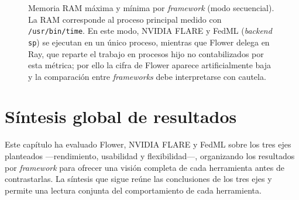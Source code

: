\begin{figure}[htbp]
  \centering
  \begin{minipage}{0.48\textwidth}
    \centering
  \end{minipage}\hfill
  \begin{minipage}{0.48\textwidth}
    \centering
  \end{minipage}
  \caption{Memoria RAM máxima y mínima por \textit{framework} (modo secuencial). La RAM corresponde al proceso principal medido con \texttt{/usr/bin/time}. En este modo, NVIDIA FLARE y FedML (\textit{backend} \texttt{sp}) se ejecutan en un único proceso, mientras que Flower delega en Ray, que reparte el trabajo en procesos hijo no contabilizados por esta métrica; por ello la cifra de Flower aparece artificialmente baja y la comparación entre \textit{frameworks} debe interpretarse con cautela.}
  \label{fig:maxmin-ram}
\end{figure}


\section{Síntesis global de resultados}\label{sec:sintesis-resultados}

Este capítulo ha evaluado Flower, NVIDIA FLARE y FedML sobre los tres ejes
planteados —rendimiento, usabilidad y flexibilidad—, organizando los resultados por
\textit{framework} para ofrecer una visión completa de cada herramienta antes de
contrastarlas. La síntesis que sigue reúne las conclusiones de los tres ejes y permite
una lectura conjunta del comportamiento de cada herramienta.

